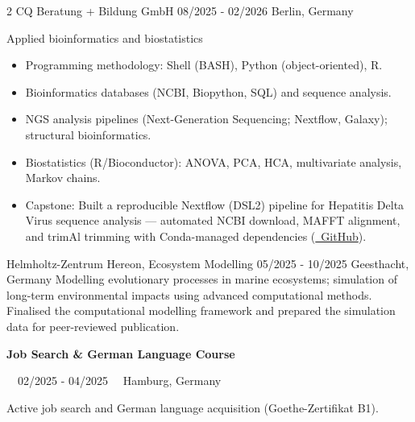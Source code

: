 \documentclass{thejus_cv}
\begin{document}
\begin{paracol}{2}
             {CQ Beratung + Bildung GmbH}
             {08/2025 - 02/2026}
             {Berlin, Germany}
             {Applied bioinformatics and biostatistics
             \begin{itemize}\setlength{\itemsep}{0.05em}
                 \item Programming methodology: Shell (BASH), Python (object-oriented), R.
                 \item Bioinformatics databases (NCBI, Biopython, SQL) and sequence analysis.
                 \item NGS analysis pipelines (Next-Generation Sequencing; Nextflow, Galaxy); structural bioinformatics.
                 \item Biostatistics (R/Bioconductor): ANOVA, PCA, HCA, multivariate analysis, Markov chains.
                 \item Capstone: Built a reproducible Nextflow (DSL2) pipeline for Hepatitis Delta Virus sequence analysis --- automated NCBI download, MAFFT alignment, and trimAl trimming with Conda-managed dependencies (\href{https://github.com/thejusmahajan/hepatitis-delta-pipeline}{\faGithub\ GitHub}).
             \end{itemize}}
\vspace{1.5em}
             {Helmholtz-Zentrum Hereon, Ecosystem Modelling}
             {05/2025 - 10/2025}
             {Geesthacht, Germany}
             {Modelling evolutionary processes in marine ecosystems; simulation of long-term environmental impacts using advanced computational methods. Finalised the computational modelling framework and prepared the simulation data for peer-reviewed publication.}

\vspace{1.5em}
{\large\textbf{Job Search \& German Language Course}}\par
{\small\color{cvgray}\faCalendar\ \ 02/2025 - 04/2025 \hspace{0.5cm} \faMapMarker\ \ Hamburg, Germany}\par
\vspace{0.2em}
{\color{cvlightgray}\hdashrule{\linewidth}{0.5pt}{1mm}}\par
\vspace{0.2em}
Active job search and German language acquisition (Goethe-Zertifikat B1).
\vspace{0.3em}


\end{paracol}
\end{document}

